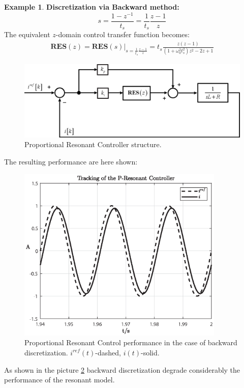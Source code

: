 \documentclass[11pt,a4paper,oneside]{book}
\numberwithin{equation}{section}
\theoremstyle{it}
\theoremstyle{definition}
\newtheorem{example}{Example}[chapter]
\begin{document}
\begin{example}
	\vspace{5mm}
	\noindent \textbf{Discretization via Backward method:} $$s=\frac{1-z^{-1}}{t_s} =\frac{1}{t_s}\frac{z-1}{z}$$
	\noindent The equivalent $z$-domain control transfer function becomes:
	\begin{equation}\label{eqRESP2}
		\begin{aligned}
			\textbf{RES}(z) =  \left. 
			\textbf{RES}(s)\right|_{s=\frac{1}{t_s}\frac{z-1}{z}}  = t_s 
			\frac{z(z-1)}{(1+\omega_0^2t_s^2)z^2-2z+1}
		\end{aligned}
	\end{equation}
	\begin{figure}[H]
		\centering
		\includegraphics[width = 320pt, 
		keepaspectratio]{figures/PRcontroller_2.eps}
		\caption{Proportional Resonant Controller structure.}
		\label{figure_PRcontroller}
	\end{figure}
	The resulting performance are here shown:
	\begin{figure}[H]
		\centering
		\includegraphics[width = 280pt,	keepaspectratio] {figures/PRbackward_performance.eps}
		\captionsetup{width=0.5\textwidth, font=small}		
		\caption{Proportional Resonant Control performance in the case of backward discretization. $i^{ref}(t)$-dashed, $i(t)$-solid.}
		\label{figure_PRbackward}
	\end{figure}
	As shown in the picture \ref{figure_PRbackward} backward discretization 
	degrade considerably the performance of the resonant model.
	

\end{example}
\end{document}
